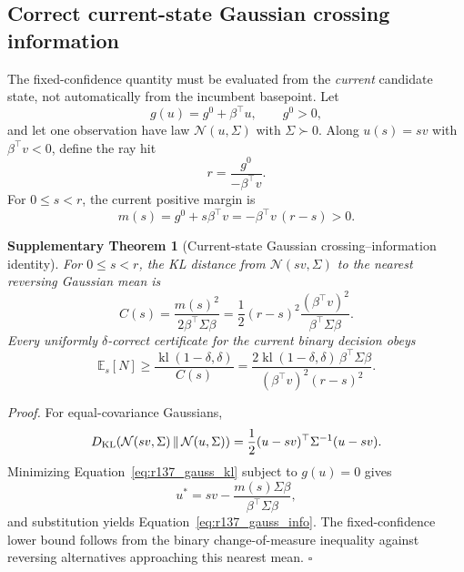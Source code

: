 \documentclass[11pt,letterpaper]{article}
\theoremstyle{plain}
\newtheorem{theorem}{Supplementary Theorem}
\newcommand{\1}{\mathbf 1}
\begin{document}
\subsection{Correct current-state Gaussian crossing information}
The fixed-confidence quantity must be evaluated from the \emph{current} candidate state, not automatically from the incumbent basepoint. Let
\begin{equation}
 g(u)=g^0+\beta^\top u,\qquad g^0>0,
\label{eq:r137_gauss_margin}
\end{equation}
and let one observation have law $\mathcal N(u,\Sigma)$ with $\Sigma\succ0$. Along $u(s)=sv$ with $\beta^\top v<0$, define the ray hit
\begin{equation}
 r=\frac{g^0}{-\beta^\top v}.
\label{eq:r137_gauss_r}
\end{equation}
For $0\le s<r$, the current positive margin is
\begin{equation}
 m(s)=g^0+s\beta^\top v=-\beta^\top v\,(r-s)>0.
\label{eq:r137_gauss_ms}
\end{equation}

\begin{theorem}[Current-state Gaussian crossing--information identity]
For $0\le s<r$, the KL distance from $\mathcal N(sv,\Sigma)$ to the nearest reversing Gaussian mean is
\begin{equation}
 C(s)=\frac{m(s)^2}{2\beta^\top\Sigma\beta}
 =\frac12(r-s)^2\frac{(\beta^\top v)^2}{\beta^\top\Sigma\beta}.
\label{eq:r137_gauss_info}
\end{equation}
Every uniformly $\delta$-correct certificate for the current binary decision obeys
\begin{equation}
 \mathbb E_s[N]\ge \frac{\operatorname{kl}(1-\delta,\delta)}{C(s)}
 =\frac{2\operatorname{kl}(1-\delta,\delta)\,\beta^\top\Sigma\beta}
 { (\beta^\top v)^2(r-s)^2 }.
\label{eq:r137_gauss_samples}
\end{equation}
\end{theorem}
\textit{Proof.} For equal-covariance Gaussians,
\begin{equation}
 D_{\rm KL}\!\left(\mathcal N(sv,\Sigma)\,\|\,\mathcal N(u,\Sigma)\right)
 =\frac12(u-sv)^\top\Sigma^{-1}(u-sv).
\label{eq:r137_gauss_kl}
\end{equation}
Minimizing Equation~\ref{eq:r137_gauss_kl} subject to $g(u)=0$ gives
\begin{equation}
 u^*=sv-\frac{m(s)\Sigma\beta}{\beta^\top\Sigma\beta},
\label{eq:r137_gauss_ustar}
\end{equation}
and substitution yields Equation~\ref{eq:r137_gauss_info}. The fixed-confidence lower bound follows from the binary change-of-measure inequality against reversing alternatives approaching this nearest mean. $\square$
\end{document}
